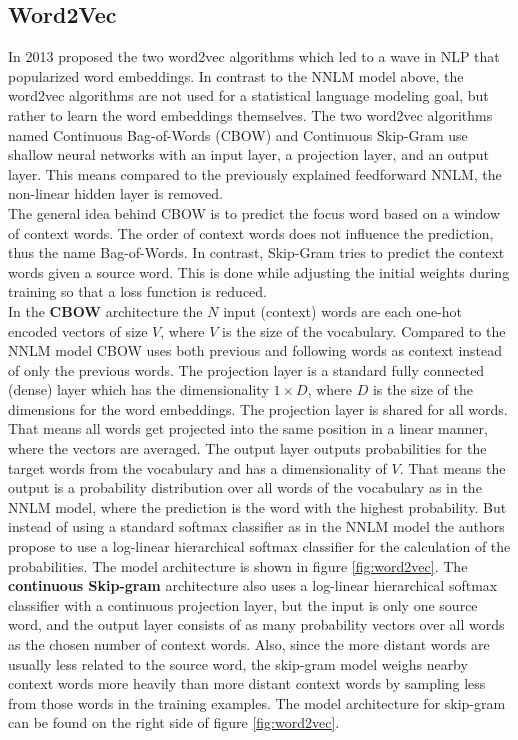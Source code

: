 \documentclass[]{krantz}
\begin{document}
\hypertarget{word2vec}{%
\subsection{Word2Vec}\label{word2vec}}

In 2013 \citet{mikolov2013efficient} proposed the two word2vec algorithms which led to a wave in NLP that popularized word embeddings. In contrast to the NNLM model above, the word2vec algorithms are not used for a statistical language modeling goal, but rather to learn the word embeddings themselves. The two word2vec algorithms named Continuous Bag-of-Words (CBOW) and Continuous Skip-Gram use shallow neural networks with an input layer, a projection layer, and an output layer. This means compared to the previously explained feedforward NNLM, the non-linear hidden layer is removed.\\
The general idea behind CBOW is to predict the focus word based on a window of context words. The order of context words does not influence the prediction, thus the name Bag-of-Words. In contrast, Skip-Gram tries to predict the context words given a source word. This is done while adjusting the initial weights during training so that a loss function is reduced.\\
In the \textbf{CBOW} architecture the \(N\) input (context) words are each one-hot encoded vectors of size \(V\), where \(V\) is the size of the vocabulary. Compared to the NNLM model CBOW uses both previous and following words as context instead of only the previous words. The projection layer is a standard fully connected (dense) layer which has the dimensionality \(1 \times D\), where \(D\) is the size of the dimensions for the word embeddings. The projection layer is shared for all words. That means all words get projected into the same position in a linear manner, where the vectors are averaged. The output layer outputs probabilities for the target words from the vocabulary and has a dimensionality of \(V\). That means the output is a probability distribution over all words of the vocabulary as in the NNLM model, where the prediction is the word with the highest probability. But instead of using a standard softmax classifier as in the NNLM model the authors propose to use a log-linear hierarchical softmax classifier for the calculation of the probabilities. The model architecture is shown in figure \ref{fig:word2vec}.
The \textbf{continuous Skip-gram} architecture also uses a log-linear hierarchical softmax classifier with a continuous projection layer, but the input is only one source word, and the output layer consists of as many probability vectors over all words as the chosen number of context words. Also, since the more distant words are usually less related to the source word, the skip-gram model weighs nearby context words more heavily than more distant context words by sampling less from those words in the training examples. The model architecture for skip-gram can be found on the right side of figure \ref{fig:word2vec}.
\end{document}
